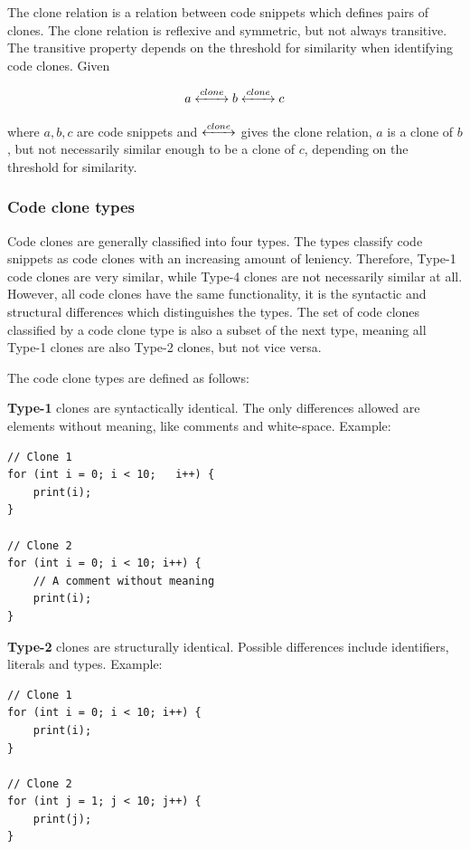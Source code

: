 \documentclass[12pt]{article}
\begin{document}
The clone relation is a relation between code snippets which defines pairs of clones.
The clone relation is reflexive and symmetric, but not always transitive. The transitive
property depends on the threshold for similarity when identifying code clones. Given

$$a \xleftrightarrow{clone} b \xleftrightarrow{clone} c$$


where $a,b,c$ are code snippets and $\xleftrightarrow{clone}$ gives the clone relation, $a$ is
a clone of $b$, but not necessarily similar enough to be a clone of $c$, depending on the
threshold for similarity.
\subsubsection{Code clone types}

Code clones are generally classified into four types\cite{Inoue_introduction_to_cc}. The
types classify code snippets as code clones with an increasing amount of leniency.
Therefore, Type-1 code clones are very similar, while Type-4 clones are not necessarily
similar at all. However, all code clones have the same functionality, it is the syntactic
and structural differences which distinguishes the types. The set of code clones
classified by a code clone type is also a subset of the next type, meaning all Type-1
clones are also Type-2 clones, but not vice versa.

The code clone types are defined as follows:

\textbf{Type-1} clones are syntactically identical. The only differences allowed are elements
without meaning, like comments and white-space. Example:

\begin{lstlisting}
// Clone 1
for (int i = 0; i < 10;   i++) {
    print(i);
}

// Clone 2
for (int i = 0; i < 10; i++) {
    // A comment without meaning
    print(i);
}

\end{lstlisting}

\textbf{Type-2} clones are structurally identical. Possible differences include
identifiers, literals and types. Example:

\begin{lstlisting}
// Clone 1
for (int i = 0; i < 10; i++) {
    print(i);
}

// Clone 2
for (int j = 1; j < 10; j++) {
    print(j);
}
\end{lstlisting}
\end{document}
